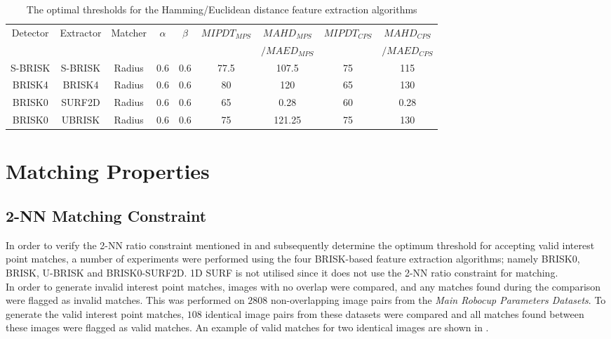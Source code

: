 \begin{table}
\centering
\caption{The optimal thresholds for the Hamming/Euclidean distance feature extraction algorithms}
\footnotesize
\begin{tabular}{|c|c|c|c|c|c|c|c|c|}
\hline 
Detector & Extractor & Matcher & $\alpha$ & $\beta$ & $MIPDT_{MPS}$ & $MAHD_{MPS}$ & $MIPDT_{CPS}$ & $MAHD_{CPS}$\tabularnewline
 &  &  &  &  &  & $/MAED_{MPS}$ &  & $/MAED_{CPS}$\tabularnewline
\hline 
\hline 
S-BRISK & S-BRISK & Radius & 0.6 & 0.6 & 77.5 & 107.5 & 75 & 115\tabularnewline
\hline 
BRISK4 & BRISK4 & Radius & 0.6 & 0.6 & 80 & 120 & 65 & 130\tabularnewline
\hline 
BRISK0 & SURF2D & Radius & 0.6 & 0.6 & 65 & 0.28 & 60 & 0.28\tabularnewline
\hline 
BRISK0 & UBRISK & Radius & 0.6 & 0.6 & 75 & 121.25 & 75 & 130\tabularnewline
\hline 
\end{tabular}
\label{tab:hammingStatistics}
\end{table}

\section{Matching Properties}
\label{sec:matchingProperties}

\subsection{2-NN Matching Constraint}
\label{sec:knnMatchingConstraint}
In order to verify the 2-NN ratio constraint mentioned in  and subsequently determine the optimum threshold for accepting valid interest point matches, a number of experiments were performed using the four BRISK-based feature extraction algorithms; namely BRISK0, BRISK, U-BRISK and BRISK0-SURF2D. 1D SURF is not utilised since it does not use the 2-NN ratio constraint for matching.\\

In order to generate invalid interest point matches, images with no overlap were compared, and any matches found during the comparison were flagged as invalid matches. This was performed on $2808$ non-overlapping image pairs from the \textit{Main Robocup Parameters Datasets}. To generate the valid interest point matches, $108$ identical image pairs from these datasets were compared and all matches found between these images were flagged as valid matches. An example of valid matches for two identical images are shown in .\\


